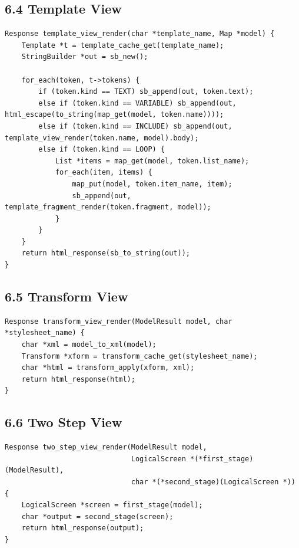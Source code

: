\documentclass[11pt]{article}
\begin{document}
\subsection{6.4 Template View}\label{template-view}

\begin{verbatim}
Response template_view_render(char *template_name, Map *model) {
    Template *t = template_cache_get(template_name);
    StringBuilder *out = sb_new();

    for_each(token, t->tokens) {
        if (token.kind == TEXT) sb_append(out, token.text);
        else if (token.kind == VARIABLE) sb_append(out, html_escape(to_string(map_get(model, token.name))));
        else if (token.kind == INCLUDE) sb_append(out, template_view_render(token.name, model).body);
        else if (token.kind == LOOP) {
            List *items = map_get(model, token.list_name);
            for_each(item, items) {
                map_put(model, token.item_name, item);
                sb_append(out, template_fragment_render(token.fragment, model));
            }
        }
    }
    return html_response(sb_to_string(out));
}
\end{verbatim}

\subsection{6.5 Transform View}\label{transform-view}

\begin{verbatim}
Response transform_view_render(ModelResult model, char *stylesheet_name) {
    char *xml = model_to_xml(model);
    Transform *xform = transform_cache_get(stylesheet_name);
    char *html = transform_apply(xform, xml);
    return html_response(html);
}
\end{verbatim}

\subsection{6.6 Two Step View}\label{two-step-view}

\begin{verbatim}
Response two_step_view_render(ModelResult model,
                              LogicalScreen *(*first_stage)(ModelResult),
                              char *(*second_stage)(LogicalScreen *)) {
    LogicalScreen *screen = first_stage(model);
    char *output = second_stage(screen);
    return html_response(output);
}
\end{verbatim}
\end{document}
